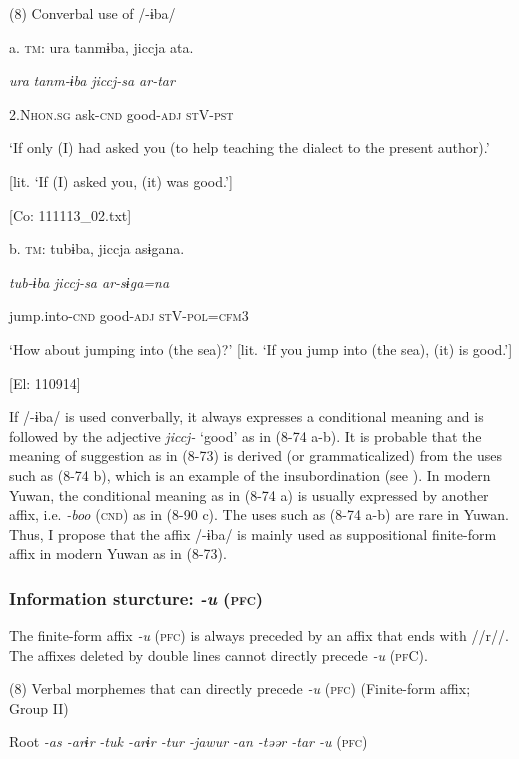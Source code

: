 (8)  Converbal use of /-ɨba/

  a.  \textsc{tm}:  ura  tanmɨba,  jiccja  ata.

      \textit{ura}  \textit{tanm-ɨba}  \textit{jiccj{}-sa  ar-tar}

      2.N\textsc{hon}.\textsc{sg}  ask-\textsc{cnd}  good-\textsc{adj}  \textsc{st}V-\textsc{pst}

      ‘If only (I) had asked you (to help teaching the dialect to the present author).’

[lit. ‘If (I) asked you, (it) was good.’]

      [Co: 111113\_02.txt]

  b.  \textsc{tm}:  tubɨba,  jiccja  asɨgana.

      \textit{tub-ɨba}  \textit{jiccj{}-sa  ar-sɨga=na}

      jump.into-\textsc{cnd}  good-\textsc{adj}  \textsc{st}V-\textsc{pol}=\textsc{cfm}3

      ‘How about jumping into (the sea)?’ [lit. ‘If you jump into (the sea), (it) is good.’]

      [El: 110914]

If /-ɨba/ is used converbally, it always expresses a conditional meaning and is followed by the adjective \textit{jiccj-} ‘good’ as in (8-74 a-b). It is probable that the meaning of suggestion as in (8-73) is derived (or grammaticalized) from the uses such as (8-74 b), which is an example of the insubordination (see ). In modern Yuwan, the conditional meaning as in (8-74 a) is usually expressed by another affix, i.e. \textit{{}-boo} (\textsc{cnd}) as in (8-90 c). The uses such as (8-74 a-b) are rare in Yuwan. Thus, I propose that the affix /-ɨba/ is mainly used as suppositional finite-form affix in modern Yuwan as in (8-73).

\subsubsection{Information sturcture: \textit{{}-u} (\textsc{pfc})}

The finite-form affix \textit{{}-u} (\textsc{pfc}) is always preceded by an affix that ends with //r//. The affixes deleted by double lines cannot directly precede \textit{{}-u} (\textsc{pf}C).

(8)  Verbal morphemes that can directly precede \textit{{}-u} (\textsc{pfc}) (Finite-form affix; Group II)

  Root  \textit{{}-as  {}-arɨr} %
\textit{{}-tuk  {}-arɨr  {}-tur  {}-jawur} %
\textit{{}-an  {}-təər  {}-tar  {}-u} (\textsc{pfc})

